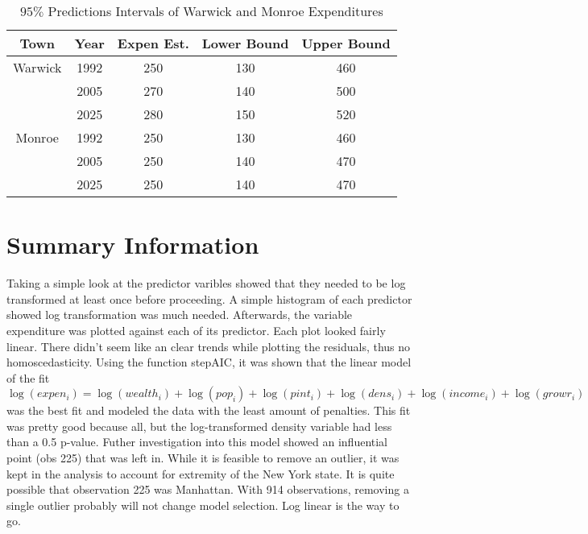 \documentclass{article}
\begin{document}
\begin{table}[h!]
  \begin{center}
    \caption{$95 \%$ Predictions Intervals of Warwick and Monroe Expenditures}
    \label{predictions}
    \begin{tabular}{c | c | c | c | c} \hline
      \textbf{Town} & \textbf{Year} & \textbf{Expen Est.} & \textbf{Lower Bound} & \textbf{Upper Bound}\\
      \hline
     Warwick & 1992 & 250 & 130 & 460 \\
                  & 2005 & 270 & 140 & 500 \\
                  & 2025 & 280 & 150 & 520 \\
                  \hline
	Monroe & 1992 & 250 & 130 & 460 \\
		     & 2005 & 250 & 140 & 470 \\
		     & 2025 & 250 & 140 & 470 \\
      
    \end{tabular}
  \end{center}
\end{table}

\section{Summary Information}
\qquad Taking a simple look at the predictor varibles showed that they needed to be log transformed at least once before proceeding. A simple histogram of each predictor showed log transformation was much needed. Afterwards, the variable expenditure was plotted against each of its predictor. Each plot looked fairly linear. There didn't seem like an clear trends while plotting the residuals, thus no homoscedasticity. Using the function stepAIC, it was shown that the linear model of the fit
  \begin{equation}
  \label{fit}
    \log (expen_i) = \log (wealth_i)+ \log (pop_i)+\log (pint_i)+\log(dens_i)+\log(income_i)+\log(growr_i)
  \end{equation}
  was the best fit and modeled the data with the least amount of penalties. This fit was pretty good because all, but the log-transformed density variable had less than a 0.5 p-value. Futher investigation into this model showed an influential point (obs 225) that was left in. While it is feasible to remove an outlier, it was kept in the analysis to account for extremity of the New York state. It is quite possible that observation 225 was Manhattan. With 914 observations, removing a single outlier probably will not change model selection. Log linear is the way to go.  
  
\end{document}
